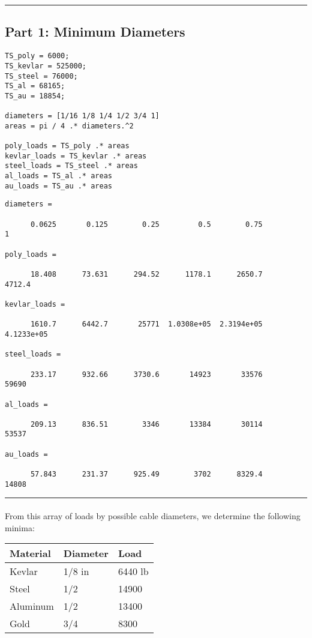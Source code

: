 \documentclass[paper=a4, fontsize=12pt]{scrartcl} %
\newcommand{\HRule}{\rule{\linewidth}{0.5mm}}
\numberwithin{equation}{section} %
\numberwithin{figure}{section} %
\numberwithin{table}{section} %
\begin{document}
\HRule

\subsection*{Part 1: Minimum Diameters}
\begin{lstlisting}[caption=Calculating Loads across Materials]
TS_poly = 6000;
TS_kevlar = 525000;
TS_steel = 76000;
TS_al = 68165;
TS_au = 18854;

diameters = [1/16 1/8 1/4 1/2 3/4 1]
areas = pi / 4 .* diameters.^2

poly_loads = TS_poly .* areas
kevlar_loads = TS_kevlar .* areas
steel_loads = TS_steel .* areas
al_loads = TS_al .* areas
au_loads = TS_au .* areas
\end{lstlisting}

\begin{lstlisting}[caption=Results for Load Calculations]
diameters =

      0.0625       0.125        0.25         0.5        0.75          1

poly_loads =

      18.408      73.631      294.52      1178.1      2650.7      4712.4

kevlar_loads =

      1610.7      6442.7       25771  1.0308e+05  2.3194e+05  4.1233e+05

steel_loads =

      233.17      932.66      3730.6       14923       33576       59690

al_loads =

      209.13      836.51        3346       13384       30114       53537

au_loads =

      57.843      231.37      925.49        3702      8329.4       14808

\end{lstlisting}

\HRule
\paragraph{} From this array of loads by possible cable diameters, we determine the following minima: \\[2ex]
\begin{tabularx}{350pt}{X X X}
Material & Diameter & Load \\
\hline
Kevlar & 1/8 in & 6440 lb \\
Steel & 1/2 & 14900 \\
Aluminum & 1/2 & 13400 \\
Gold & 3/4 & 8300 \\
\hline
\end{tabularx}
\end{document}
